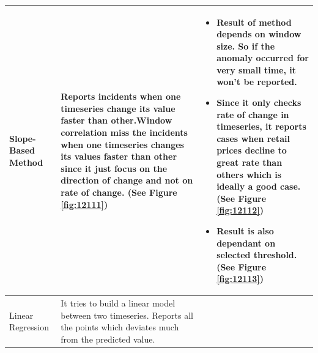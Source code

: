 \begin{table}[H]
{\begin{tabular}{|L{3cm} | L{5cm} | L{8cm}|}
 \\ \hline
Slope-Based Method                    & Reports incidents when one timeseries change its value faster than other.Window correlation miss the incidents when one timeseries changes its values faster than other since it just focus on the direction of change and not on rate of change. (See Figure \ref{fig:12111})     & \begin{itemize}
                                                                                                                                                                                                                                                                                                                  \item Result of method depends on window size. So if the anomaly occurred for very small time, it won't be reported.
                                                                                                                                                                                                                                                                                                                  \item Since it only checks rate of change in timeseries, it reports cases when retail prices decline to great rate than others which is ideally a good case. (See Figure \ref{fig:12112})
                                                                                                                                                                                                                                                                                                                  \item Result is also dependant on selected threshold. (See Figure \ref{fig:12113})
                                                                                                                                                                                                                                                                                                                 \end{itemize}
 \\ \hline
Linear Regression                     & It tries to build a linear model between two timeseries. Reports all the points which deviates much from the predicted value.                                                                                                                                          & \begin{itemize}

\end{itemize}
\end{tabular}}
\end{table}
